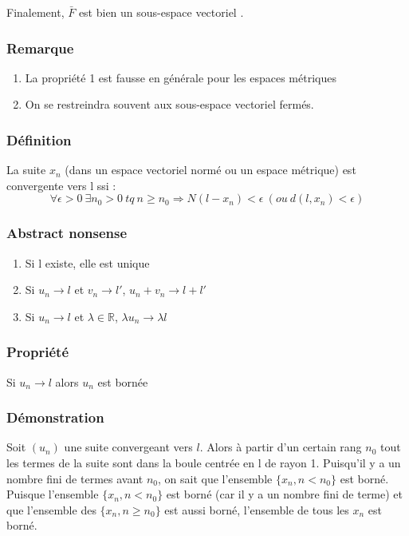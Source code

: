 \documentclass[a4paper, oneside]{report}
\newcommand{\R}{\mathbb{R}}
\newcommand{\sev}{sous-espace vectoriel }
\newcommand{\ev}{espace vectoriel }
\begin{document}
Finalement, $\bar{F}$ est bien un \sev.

\subsubsection{Remarque}
\begin{enumerate}
\item La propriété 1 est fausse en générale pour les espaces métriques
\item On se restreindra souvent aux \sev fermés.
\end{enumerate}

\subsubsection{Définition}

La suite $x_n$ (dans un \ev normé ou un espace métrique) est convergente vers l ssi :
$$\forall \epsilon >0~ \exists n_0>0~tq~n\geq n_0 \Rightarrow N(l-x_n)<\epsilon~(ou~d(l,x_n)<\epsilon)$$

\subsubsection{Abstract nonsense}

\begin{enumerate}
\item Si l existe, elle est unique
\item Si $u_n \rightarrow l$ et $v_n\rightarrow l'$, $u_n+v_n \rightarrow l+l'$
\item Si $u_n \rightarrow l$ et $\lambda \in \R$, $\lambda u_n \rightarrow \lambda l$
\end{enumerate}

\subsubsection{Propriété}
Si $u_n\rightarrow l$ alors $u_n$ est bornée

\subsubsection{Démonstration}
Soit $(u_n)$ une suite convergeant vers $l$.
Alors à partir d'un certain rang $n_0$ tout les termes de la suite sont dans la boule centrée en l de rayon 1.
Puisqu'il y a un nombre fini de termes avant $n_0$, on sait que l'ensemble $\{x_n, n < n_0\}$ est borné.
Puisque l'ensemble $\{x_n,  n < n_0\}$ est borné (car il y a un nombre fini de terme) et que l'ensemble des $\{x_n,  n \geq n_0\}$ est aussi borné, l'ensemble de tous les $x_n$ est borné.
\end{document}
